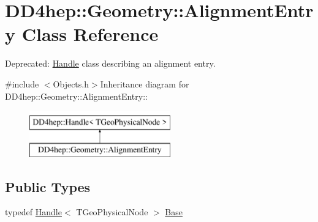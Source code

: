 \hypertarget{class_d_d4hep_1_1_geometry_1_1_alignment_entry}{
\section{DD4hep::Geometry::AlignmentEntry Class Reference}
\label{class_d_d4hep_1_1_geometry_1_1_alignment_entry}
}


Deprecated: \hyperlink{class_d_d4hep_1_1_handle}{Handle} class describing an alignment entry.  


{\ttfamily \#include $<$Objects.h$>$}Inheritance diagram for DD4hep::Geometry::AlignmentEntry::\begin{figure}[H]
\begin{center}
\leavevmode
\includegraphics[height=2cm]{class_d_d4hep_1_1_geometry_1_1_alignment_entry}
\end{center}
\end{figure}
\subsection*{Public Types}
\begin{DoxyCompactItemize}
\item 
typedef \hyperlink{class_d_d4hep_1_1_handle}{Handle}$<$ TGeoPhysicalNode $>$ \hyperlink{class_d_d4hep_1_1_geometry_1_1_alignment_entry_a5292caf0fb24d8750c2c24ef8f69a258}{Base}
\end{DoxyCompactItemize}

